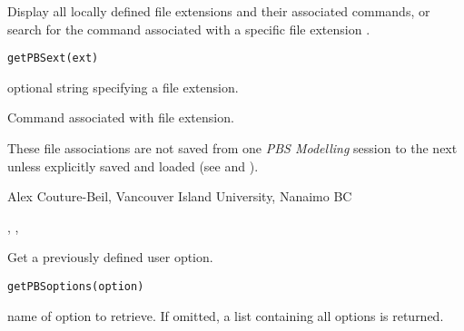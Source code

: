 \documentclass[letterpaper]{book}
\begin{document}
%
\begin{Description}\relax
Display all locally defined file extensions and their associated commands, 
or search for the command associated with a specific file extension
.
\end{Description}
%
\begin{Usage}
\begin{verbatim}
getPBSext(ext)
\end{verbatim}
\end{Usage}
%
\begin{Arguments}
\begin{ldescription}
\item[\code{ext}] optional string specifying a file extension.
\end{ldescription}
\end{Arguments}
%
\begin{Value}
Command associated with file extension.
\end{Value}
%
\begin{Note}\relax
These file associations are not saved from one \emph{PBS Modelling} session to
the next unless explicitly saved and loaded (see  and
).
\end{Note}
%
\begin{Author}\relax
Alex Couture-Beil, Vancouver Island University, Nanaimo BC
\end{Author}
%
\begin{SeeAlso}\relax
{}, , 
\end{SeeAlso}
%
\begin{Description}\relax
Get a previously defined user option.
\end{Description}
%
\begin{Usage}
\begin{verbatim}
getPBSoptions(option)
\end{verbatim}
\end{Usage}
%
\begin{Arguments}
\begin{ldescription}
\item[\code{option}] name of option to retrieve. If omitted, a list containing all options is returned.
\end{ldescription}
\end{Arguments}
\end{document}
